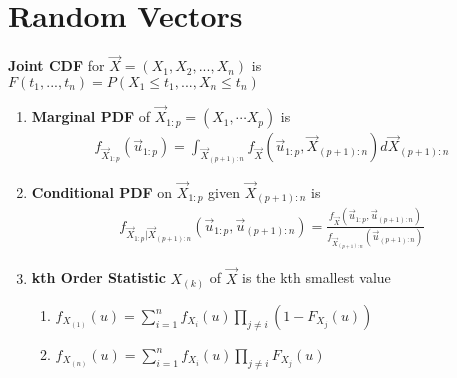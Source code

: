 \documentclass[a4paper,portrait,columns=2, hidelinks]{cheatsheet}
\begin{document}
\newpage

\section{Random Vectors}
\textbf{Joint CDF} for \( \vec{X} = (X_1, X_2, ..., X_n)\) is \(F(t_1,...,t_n)=P(X_1 \le t_1, ..., X_n \le t_n)\)
\begin{enumerate}
	\item  \textbf{Marginal PDF} of \(\vec{X}_{1:p} = (X_{1}, \cdots X_{p})\) is 
	\begin{align*}
	f_{\vec{X}_{1:p}}\left(\vec{u}_{1:p}\right) = \int_{\vec{X}_{(p+1):n}}f_{\vec{X}}\left(\vec{u}_{1:p}, \vec{X}_{(p+1):n}\right)d\vec{X}_{(p+1):n}
	\end{align*}
	\item \textbf{Conditional PDF} on \(\vec{X}_{1:p}\) given \(\vec{X}_{(p+1):n}\) is 
	\begin{align*}
	f_{\vec{X}_{1:p} | \vec{X}_{(p+1):n}}\left(\vec{u}_{1:p}, \vec{u}_{(p+1):n}\right) =\frac{f_{\vec{X}}\left(\vec{u}_{1:p}, \vec{u}_{(p+1):n}\right)}{f_{\vec{X}_{(p+1):n}}\left(\vec{u}_{(p+1):n}\right)}
	\end{align*}
	\item \textbf{kth Order Statistic} \( X_{(k)}\) of \( \vec{X}\) is the kth smallest value
	\begin{enumerate}
		 \item \( f_{X_{(1)}}(u) = \sum_{i=1}^n f_{X_i}(u)\prod_{j \ne i}(1 - F_{X_j}(u))\)
		\item \( f_{X_{(n)}}(u)=\sum_{i=1}^n f_{X_i}(u)\prod_{j \ne i}F_{X_j}(u)\)
	\end{enumerate}
\end{enumerate}
\end{document}
